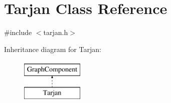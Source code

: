 \hypertarget{class_tarjan}{}\section{Tarjan Class Reference}
\label{class_tarjan}


{\ttfamily \#include $<$tarjan.\+h$>$}

Inheritance diagram for Tarjan\+:\begin{figure}[H]
\begin{center}
\leavevmode
\includegraphics[height=2.000000cm]{class_tarjan}
\end{center}
\end{figure}
